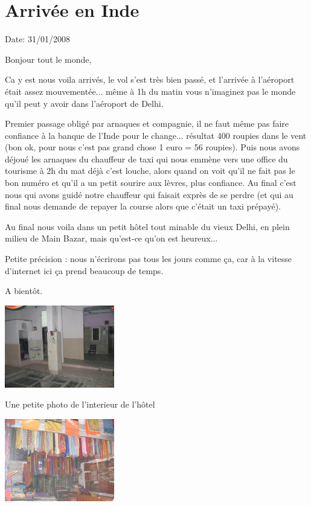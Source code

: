 \section{Arrivée en Inde}

Date: 31/01/2008

\begin{multicols}{2}

Bonjour tout le monde,

Ca y est nous voila arrivés, le vol s'est très bien passé, et l'arrivée à l'aéroport était assez mouvementée... même à 1h du matin vous n'imaginez pas le monde qu'il peut y avoir dans l'aéroport de Delhi.

Premier passage obligé par arnaques et compagnie, il ne faut même pas faire confiance à la banque de l'Inde pour le change... résultat 400 roupies dans le vent (bon ok, pour nous c'est pas grand chose 1 euro = 56 roupies). Puis nous avons déjoué les arnaques du chauffeur de taxi qui nous emmène vers une office du tourisme à 2h du mat déjà c'est louche, alors quand on voit qu'il ne fait pas le bon numéro et qu'il a un petit sourire aux lèvres, plus confiance. Au final c'est nous qui avons guidé notre chauffeur qui faisait exprès de se perdre (et qui au final nous demande de repayer la course alors que c'était un taxi prépayé).

Au final nous voila dans un petit hôtel tout minable du vieux Delhi, en plein milieu de Main Bazar, mais qu'est-ce qu'on est heureux...

Petite précision : nous n'écrirons pas tous les jours comme ça, car à la vitesse d'internet ici ça prend beaucoup de temps.

A bientôt.

\hspace*{-0.65cm}
\includegraphics[width=4.8cm]{articles/Arrivee-en-inde/hotel.jpg}

Une petite photo de l'interieur de l'hôtel

\hspace*{-0.65cm}
\includegraphics[width=4.8cm]{articles/Arrivee-en-inde/magasin.jpg}


\end{multicols}
